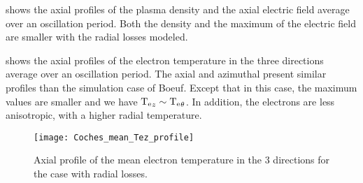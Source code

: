    shows the axial profiles of the plasma density and the axial electric field average over an oscillation period.
  Both the density and the maximum of the electric field are smaller with the radial losses modeled.
  
   shows the axial profiles of the electron temperature in the three directions average over an oscillation period.
  The axial and azimuthal present similar profiles than the simulation case of Boeuf.
  Except that in this case, the maximum values are smaller and we have $\mathrm{T_e}_z \sim \mathrm{T_e}_{\theta}$.
  In addition, the electrons are less anisotropic, with a higher radial temperature.
  
  \begin{figure}[hbtp]
    \centering
    \texttt{[image: Coches\_mean\_Tez\_profile]}
    \caption{ Axial profile of the mean electron temperature in the 3 directions for the case with radial losses.}
    \label{fig-coche-axial-Te}
  \end{figure}
  
